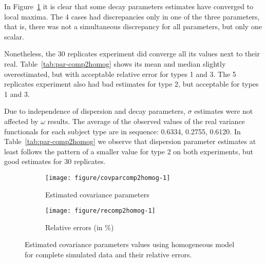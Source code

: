 In Figure~\ref{fig:cpest-comp2homog} it is clear that some decay parameters estimates have converged to local maxima. The 4 cases had discrepancies only in one of the three parameters, that is, there was not a simultaneous discrepancy for all parameters, but only one scalar.

Nonetheless, the 30 replicates experiment did converge all its values next to their real. Table~\ref{tab:par-comp2homog} shows its mean and median slightly overestimated, but with acceptable relative error for types 1 and 3. The 5 replicates experiment also had bad estimates for type 2, but acceptable for types 1 and 3. 

Due to independence of dispersion and decay parameters, $\sigma$ estimates were not affected by $\omega$ results. The average of the observed values of the real variance functionals for each subject type are in sequence: 0.6334, 0.2755, 0.6120. In Table~\ref{tab:par-comp2homog} we observe that dispersion parameter estimates at least follows the pattern of a smaller value for type 2 on both experiments, but good estimates for 30 replicates. 


\begin{figure}[t]
 \begin{subfigure}{\textwidth}
  \centering
\begin{knitrout}
\color{fgcolor}
\texttt{[image: figure/covparcomp2homog-1]} 

\end{knitrout}
    \caption{Estimated covariance parameters} \label{fig:cpest-comp2homog}
   \end{subfigure}
  \begin{subfigure}{\textwidth}
  \centering
\begin{knitrout}
\color{fgcolor}
\texttt{[image: figure/recomp2homog-1]} 

\end{knitrout}
   \caption{Relative errors (in \%) }\label{fig:re-comp2homog}
 \end{subfigure}
 \caption{Estimated covariance parameters values using homogeneous model for complete simulated data and their relative errors.}
  \label{fig:cp-comp2homog}
\end{figure}  


